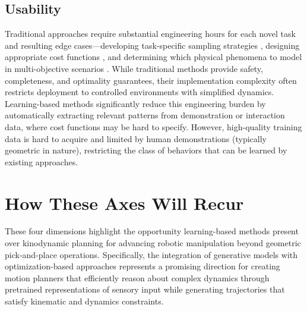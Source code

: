 \subsection{Usability}
\label{sec:framework:usability}

Traditional approaches require substantial engineering hours for each novel task and resulting edge cases---developing task-specific sampling strategies \cite{abderezaei2024clutter}, designing appropriate cost functions \cite{pasricha2024virtues}, and determining which physical phenomena to model in multi-objective scenarios \cite{pasricha2022pokerrt}. While traditional methods provide safety, completeness, and optimality guarantees, their implementation complexity often restricts deployment to controlled environments with simplified dynamics.
Learning-based methods significantly reduce this engineering burden by automatically extracting relevant patterns from demonstration or interaction data, where cost functions may be hard to specify.
However, high-quality training data is hard to acquire and limited by human demonstrations (typically geometric in nature), restricting the class of behaviors that can be learned by existing approaches.

\section{How These Axes Will Recur}
\label{sec:framework:recurrence}

These four dimensions highlight the opportunity learning-based methods present over kinodynamic planning for advancing robotic manipulation beyond geometric pick-and-place operations. Specifically, the integration of generative models with optimization-based approaches represents a promising direction for creating motion planners that efficiently reason about complex dynamics through pretrained representations of sensory input while generating trajectories that satisfy kinematic and dynamics constraints.
